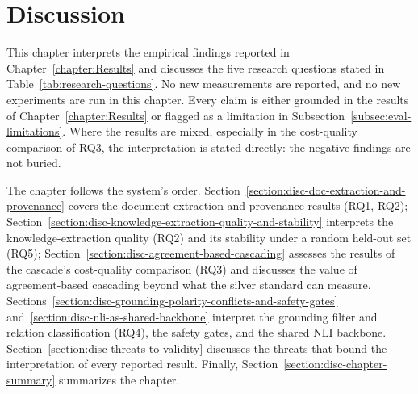 
\chapter{Discussion}\label{chapter:Discussion}

This chapter interprets the empirical findings reported in Chapter~\ref{chapter:Results} and discusses the five research questions stated in Table~\ref{tab:research-questions}. No new measurements are reported, and no new experiments are run in this chapter. Every claim is either grounded in the results of Chapter~\ref{chapter:Results} or flagged as a limitation in Subsection~\ref{subsec:eval-limitations}. Where the results are mixed, especially in the cost-quality comparison of RQ3, the interpretation is stated directly: the negative findings are not buried.

The chapter follows the system's order. Section~\ref{section:disc-doc-extraction-and-provenance} covers the document-extraction and provenance results (RQ1, RQ2); Section~\ref{section:disc-knowledge-extraction-quality-and-stability} interprets the knowledge-extraction quality (RQ2) and its stability under a random held-out set (RQ5); Section~\ref{section:disc-agreement-based-cascading} assesses the results of the cascade's cost-quality comparison (RQ3) and discusses the value of agreement-based cascading beyond what the silver standard can measure. Sections~\ref{section:disc-grounding-polarity-conflicts-and-safety-gates} and~\ref{section:disc-nli-as-shared-backbone} interpret the grounding filter and relation classification (RQ4), the safety gates, and the shared NLI backbone. Section~\ref{section:disc-threats-to-validity} discusses the threats that bound the interpretation of every reported result. Finally, Section~\ref{section:disc-chapter-summary} summarizes the chapter.

% 






